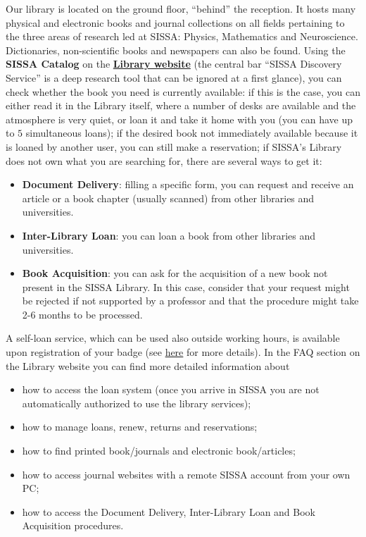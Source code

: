 \documentclass{sissavademecum}
\begin{document}
Our library is located on the ground floor, ``behind'' the reception. It hosts many physical and electronic books and journal collections on all fields pertaining to the three areas of research led at SISSA: Physics, Mathematics and Neuroscience. Dictionaries, non-scientific books and newspapers can also be found. Using the \textbf{SISSA Catalog} on the  \href{http://library.sissa.it}{\textbf{Library website}} (the central bar ``SISSA Discovery Service'' is a deep research tool that can be ignored at a first glance), you can check whether the book you need is currently available: if this is the case, you can either read it in the Library itself, where a number of desks are available and the atmosphere is very quiet, or loan it and take it home with you (you can have up to $5$ simultaneous loans); if the desired book not immediately available because it is loaned by another user, you can still make a reservation; if SISSA's Library does not own what you are searching for, there are several ways to get it:
\begin{itemize}
    \item \textbf{Document Delivery}: filling a specific form, you can request and receive an article or a book chapter (usually scanned) from other libraries and universities.
    \item \textbf{Inter-Library Loan}: you can loan a book from other libraries and universities.
    \item \textbf{Book Acquisition}: you can ask for the acquisition of a new book not present in the SISSA Library. In this case, consider that your request might be rejected if not supported by a professor and that the procedure might take 2-6 months to be processed. 
\end{itemize}

A self-loan service, which can be used also outside working hours, is available upon registration of your badge (see \hyperlink{Badge}{here} for more details). In the FAQ section on the Library website you can find more detailed information about
\begin{itemize}
    \item how to access the loan system (once you arrive in SISSA you are not automatically authorized to use the library services);
    \item how to manage loans, renew, returns and reservations;
    \item how to find printed book/journals and electronic book/articles;
    \item how to access journal websites with a remote SISSA account from your own PC;
    \item how to access the Document Delivery, Inter-Library Loan and Book Acquisition procedures.
\end{itemize}
\end{document}
